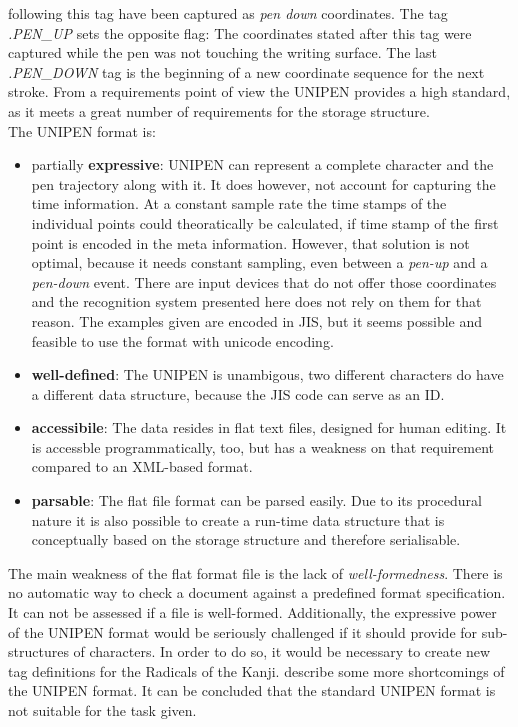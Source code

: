following this tag have been captured as \emph{pen down} coordinates.
The tag \emph{.PEN\_UP} sets the opposite flag: The coordinates stated after 
this tag were captured while the pen was not touching the writing surface.
The last \emph{.PEN\_DOWN} tag is the beginning of a new coordinate sequence
for the next stroke. From a requirements point of view the UNIPEN provides a
high standard, as it meets a great number of requirements for the storage 
structure. \\
The UNIPEN format is:
\begin{itemize}
  \item partially \textbf{expressive}: UNIPEN can represent a complete character
        and the pen trajectory along with it. It does however, not account for
        capturing the time information. At a constant sample rate the time stamps
        of the individual points could theoratically be calculated, 
        if time stamp of the first point is encoded in the meta information. 
        However, that solution is not optimal, because it needs constant
        sampling, even between a \emph{pen-up} and a \emph{pen-down} event.
        There are input devices that do not offer those coordinates and the 
        recognition system presented here does not rely on them for that reason.
        The examples given are encoded in JIS, but it seems possible and feasible
        to use the format with unicode encoding.

  \item \textbf{well-defined}: The UNIPEN is unambigous, two different 
        characters do have a different data structure, because the JIS code 
        can serve as an ID.

  \item \textbf{accessibile}: The data resides in flat text files, designed for 
        human editing. It is accessble programmatically, too, but has a weakness
        on that requirement compared to an XML-based format.

  \item \textbf{parsable}: The flat file format can be parsed easily. Due to its
        procedural nature it is also possible to create a run-time data structure
        that is conceptually based on the storage structure and therefore
        serialisable.
\end{itemize}
The main weakness of the flat format file is the lack of \emph{well-formedness}.
There is no automatic way to check a document against a predefined format 
specification. It can not be assessed if a file is well-formed.
Additionally, the expressive power of the UNIPEN format would be seriously 
challenged if it should provide for sub-structures of characters.
In order to do so, it would be necessary to create new tag definitions for the 
Radicals of the Kanji.  \citeyear{Agrawal2005} 
describe some more shortcomings of the UNIPEN format. It can be concluded that 
the standard UNIPEN format is not suitable for the task given. 

